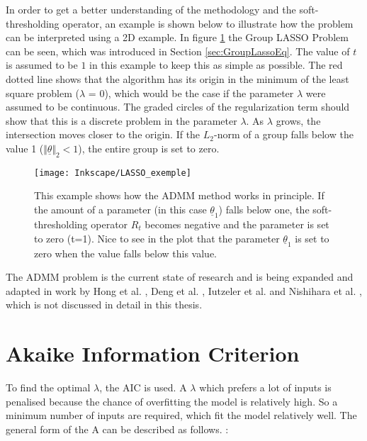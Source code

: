 In order to get a better understanding of the methodology and the soft-thresholding operator, an example is shown below to illustrate how the problem can be interpreted using a 2D example. In figure \ref{fig:LASSO_exemple} the Group LASSO Problem can be seen, which was introduced in Section \ref{sec:GroupLassoEq}. The value of $t$ is assumed to be $1$ in this example to keep this as simple as possible. The red dotted line shows that the algorithm has its origin in the minimum of the least square problem ($\lambda$ = 0), which would be the case if the parameter $\lambda$ were assumed to be continuous. The graded circles of the regularization term should show that this is a discrete problem in the parameter $\lambda$. As $\lambda$ grows, the intersection moves closer to the origin. If the $L_2$-norm of a group falls below the value 1 ($ \Vert \underline{\theta} \Vert_2 <1$), the entire group is set to zero.


\begin{figure}[!htb]
    \centering
    \texttt{[image: Inkscape/LASSO\_exemple]} %
    \caption[Example of 2D Group LASSO Problem]{This example shows how the ADMM method works in principle. If the amount of a parameter (in this case $\underline{\theta}_1$) falls below one, the soft-thresholding operator $R_t$ becomes negative and the parameter is set to zero (t=1). Nice to see in the plot that the parameter $\underline{\theta}_1$ is set to zero when the value falls below this value. 
}
    \label{fig:LASSO_exemple}
\end{figure}

The ADMM problem is the current state of research and is being expanded and adapted in work by Hong et al. \cite{Hong_2018},
Deng et al. \cite{Deng_2016}, Iutzeler et al. \cite{Iutzeler_2013} and Nishihara et al. \cite{Nishihara2015}, which is not discussed in detail in this thesis.


\section{Akaike Information Criterion}
\label{sec:Akaike}

To find the optimal $\lambda$, the AIC is used. A $\lambda$ which prefers a lot of inputs is penalised because the chance of overfitting the model is relatively high. So a minimum number of inputs are required, which fit the model relatively well. The general form of the A can be described as follows. \cite{Akaike_1974}:

